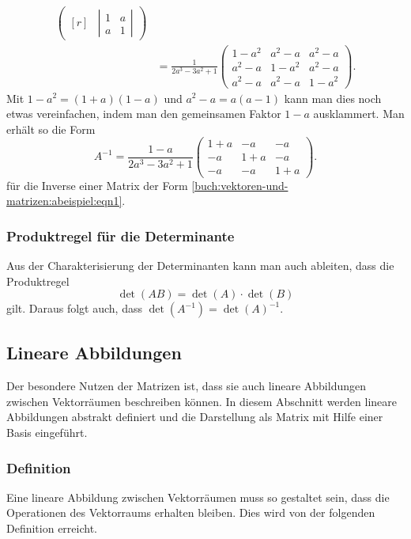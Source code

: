 \begin{beispiel}
\begin{align*}
\begin{pmatrix*}[r]
&
\left|\begin{matrix}1&a\\a&1\end{matrix}\right|
\end{pmatrix*}
\\
&=
\frac{1}{2a^3-3a^2+1}
\begin{pmatrix}
1-a^2 & a^2-a & a^2-a\\
a^2-a & 1-a^2 & a^2-a\\
a^2-a & a^2-a & 1-a^2
\end{pmatrix}.
\end{align*}
Mit $1-a^2=(1+a)(1-a)$ und $a^2-a=a(a-1)$ kann man dies noch etwas
vereinfachen, indem man den gemeinsamen Faktor $1-a$ ausklammert.
Man erhält so die Form
\begin{equation}
A^{-1}
=
\frac{1-a}{2a^3-3a^2+1}
\begin{pmatrix}
1+a &  -a &  -a \\
 -a & 1+a &  -a \\
 -a &  -a & 1+a
\end{pmatrix}.
\label{buch:vektoren-und-matrizen:abeispiel:eqn2}
\end{equation}
für die Inverse einer Matrix der Form
\eqref{buch:vektoren-und-matrizen:abeispiel:eqn1}.
\end{beispiel}

\subsubsection{Produktregel für die Determinante}
Aus der Charakterisierung der Determinanten kann man auch ableiten,
dass  die Produktregel 
%
\[
\det (AB) = \det(A) \cdot \det(B)
\]
gilt.
Daraus folgt auch, dass $\det(A^{-1})=\det(A)^{-1}$.

%
%
\subsection{Lineare Abbildungen
\label{buch:grundlagen:subsection:lineare-abbildungen}}
Der besondere Nutzen der Matrizen ist, dass sie auch lineare Abbildungen
zwischen Vektorräumen beschreiben können.
In diesem Abschnitt werden lineare Abbildungen abstrakt definiert
und die Darstellung als Matrix mit Hilfe einer Basis eingeführt.


\subsubsection{Definition}
Eine lineare Abbildung zwischen Vektorräumen muss so gestaltet sein,
dass die Operationen des Vektorraums erhalten bleiben.
Dies wird von der folgenden Definition erreicht.

